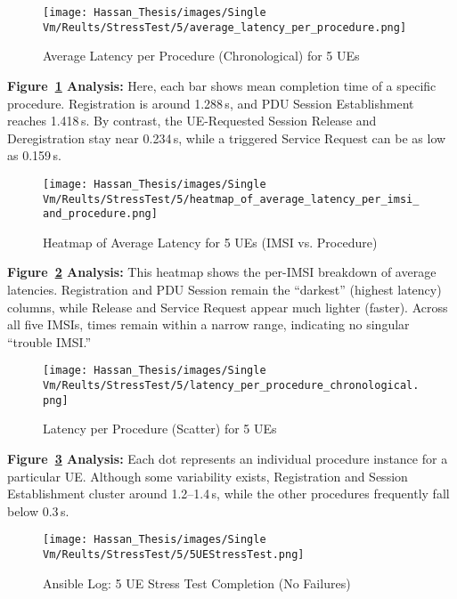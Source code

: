 \vspace{0.75em}
\begin{figure}[H]
    \centering
    \texttt{[image: Hassan\_Thesis/images/Single Vm/Reults/StressTest/5/average\_latency\_per\_procedure.png]}
    \caption{Average Latency per Procedure (Chronological) for 5 UEs}
    \label{fig:5ue-avg-latency}
\end{figure}

\noindent
\textbf{Figure~\ref{fig:5ue-avg-latency} Analysis:}  
Here, each bar shows mean completion time of a specific procedure. Registration is around 1.288\,s, and PDU Session Establishment reaches 1.418\,s. By contrast, the UE-Requested Session Release and Deregistration stay near 0.234\,s, while a triggered Service Request can be as low as 0.159\,s.

\vspace{0.75em}
\begin{figure}[H]
    \centering
    \texttt{[image: Hassan\_Thesis/images/Single Vm/Reults/StressTest/5/heatmap\_of\_average\_latency\_per\_imsi\_and\_procedure.png]}
    \caption{Heatmap of Average Latency for 5 UEs (IMSI vs. Procedure)}
    \label{fig:5ue-heatmap-latency}
\end{figure}

\noindent
\textbf{Figure~\ref{fig:5ue-heatmap-latency} Analysis:}  
This heatmap shows the per-IMSI breakdown of average latencies. Registration and PDU Session remain the “darkest” (highest latency) columns, while Release and Service Request appear much lighter (faster). Across all five IMSIs, times remain within a narrow range, indicating no singular “trouble IMSI.”

\vspace{0.75em}
\begin{figure}[H]
    \centering
    \texttt{[image: Hassan\_Thesis/images/Single Vm/Reults/StressTest/5/latency\_per\_procedure\_chronological.png]}
    \caption{Latency per Procedure (Scatter) for 5 UEs}
    \label{fig:5ue-scatter-latency}
\end{figure}

\noindent
\textbf{Figure~\ref{fig:5ue-scatter-latency} Analysis:}  
Each dot represents an individual procedure instance for a particular UE. Although some variability exists, Registration and Session Establishment cluster around 1.2--1.4\,s, while the other procedures frequently fall below 0.3\,s.

\vspace{0.75em}
\begin{figure}[H]
    \centering
    \texttt{[image: Hassan\_Thesis/images/Single Vm/Reults/StressTest/5/5UEStressTest.png]}
    \caption{Ansible Log: 5 UE Stress Test Completion (No Failures)}
    \label{fig:5ue-ansible-output}
\end{figure}

